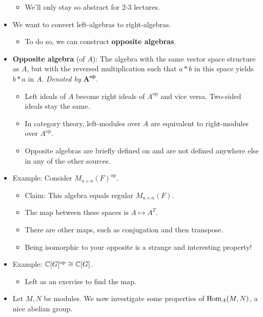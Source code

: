 \documentclass[../notes.tex]{subfiles}
\begin{document}
\begin{itemize}
    \begin{itemize}
        \item We'll only stay so abstract for 2-3 lectures.
    \end{itemize}
    \item We want to convert left-algebras to right-algebras.
    \begin{itemize}
        \item To do so, we can construct \textbf{opposite algebras}.
    \end{itemize}
    \item \textbf{Opposite algebra} (of $A$): The algebra with the same vector space structure as $A$, but with the reversed multiplication such that $a*b$ in this space yields $b*a$ in $A$. \emph{Denoted by} $\bm{A^\textbf{op}}$.
    \begin{itemize}
        \item Left ideals of $A$ become right ideals of $A^\text{op}$ and vice versa. Two-sided ideals stay the same. 
        \item In category theory, left-modules over $A$ are equivalent to right-modules over $A^\text{op}$.
        \item Opposite algebras are briefly defined on \textcite[308]{bib:FultonHarris} and are not defined anywhere else in any of the other sources.
    \end{itemize}
    \item Example: Consider $M_{n\times n}(F)^\text{op}$.
    \begin{itemize}
        \item Claim: This algebra equals regular $M_{n\times n}(F)$.
        \item The map between these spaces is $A\mapsto A^T$.
        \item There are other maps, such as conjugation and then transpose.
        \item Being isomorphic to your opposite is a strange and interesting property!
    \end{itemize}
    \item Example: $\mathbb{C}[G]^\text{op}\cong\mathbb{C}[G]$.
    \begin{itemize}
        \item Left as an exercise to find the map.
    \end{itemize}
    \item Let $M,N$ be modules. We now investigate some properties of $\operatorname{Hom}_A(M,N)$, a nice abelian group.
    \begin{itemize}

\end{itemize}
\end{itemize}
\end{document}
